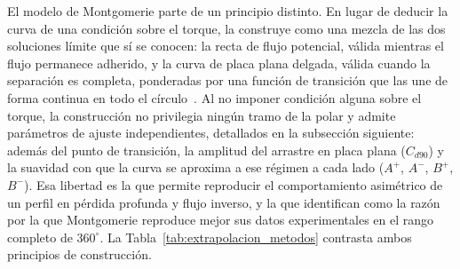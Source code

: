 El modelo de Montgomerie parte de un principio distinto. En lugar de deducir la curva de una condición sobre el torque, la construye como una mezcla de las dos soluciones límite que sí se conocen: la recta de flujo potencial, válida mientras el flujo permanece adherido, y la curva de placa plana delgada, válida cuando la separación es completa, ponderadas por una función de transición que las une de forma continua en todo el círculo~\parencite{montgomerie2004methods}. Al no imponer condición alguna sobre el torque, la construcción no privilegia ningún tramo de la polar y admite parámetros de ajuste independientes, detallados en la subsección siguiente: además del punto de transición, la amplitud del arrastre en placa plana ($C_{d90}$) y la suavidad con que la curva se aproxima a ese régimen a cada lado ($A^+$, $A^-$, $B^+$, $B^-$). Esa libertad es la que permite reproducir el comportamiento asimétrico de un perfil en pérdida profunda y flujo inverso, y la que \textcite{Bianchini2015} identifican como la razón por la que Montgomerie reproduce mejor sus datos experimentales en el rango completo de $360^\circ$. La Tabla~\ref{tab:extrapolacion_metodos} contrasta ambos principios de construcción.

